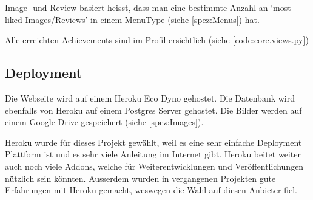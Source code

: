 Image- und Review-basiert heisst, dass man eine bestimmte Anzahl an `most liked
Images/Reviews' in einem MenuType (siehe \ref{spez:Menus}) hat.

Alle erreichten Achievements sind im Profil ersichtlich (siehe \ref{code:core.views.py})

\subsection{Deployment} \label{spez:Deployment}

Die Webseite wird auf einem Heroku Eco Dyno gehostet. Die Datenbank wird ebenfalls
von Heroku auf einem Postgres Server gehostet. Die Bilder werden auf einem
Google Drive gespeichert (siehe \ref{spez:Images}).

Heroku wurde für dieses Projekt gewählt, weil es eine sehr einfache
 Deployment Plattform ist und es sehr viele Anleitung im Internet
gibt. Heroku beitet weiter auch noch viele Addons, welche für
Weiterentwicklungen und Veröffentlichungen nützlich sein könnten. Ausserdem
wurden in vergangenen Projekten gute Erfahrungen mit Heroku gemacht, weswegen
die Wahl auf diesen Anbieter fiel.
